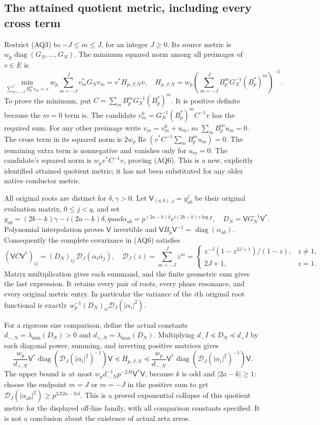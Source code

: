 \documentclass[11pt,a4paper]{article}
\theoremstyle{definition}\newtheorem{definition}[theorem]{Definition}
\begin{document}
\subsection{The attained quotient metric, including every cross term}
Restrict (AQ3) to $-J\le m\le J$, for an integer $J\ge0$. Its
source metric is $w_p\operatorname{diag}(G_N,\ldots,G_N)$.
The minimum squared norm among all preimages of $v\in E$ is
\[
 \min_{\sum_{m=-J}^J B_p^mv_m=v}
      w_p\sum_{m=-J}^Jv_m^*G_Nv_m
  =v^*H_{p,J;N}v,
 \quad
 H_{p,J;N}=w_p\left(
   \sum_{m=-J}^J B_p^mG_N^{-1}(B_p^*)^m\right)^{-1}.
 \tag{AQ6}
\]
To prove the minimum, put $C=\sum_mB_p^mG_N^{-1}(B_p^*)^m$.
It is positive definite because the $m=0$ term is. The candidate
$v_m^0=G_N^{-1}(B_p^*)^m C^{-1}v$ has the required sum. For any
other preimage write $v_m=v_m^0+u_m$, so $\sum_mB_p^mu_m=0$.
The cross term in its squared norm is
$2w_p\operatorname{Re}(v^*C^{-1}\sum_mB_p^mu_m)=0$.
The remaining extra term is nonnegative and vanishes only for $u_m=0$.
The candidate's squared norm is $w_pv^*C^{-1}v$, proving (AQ6).
This is a new, explicitly identified attained quotient metric; it has
not been substituted for any older native conductor metric.

All original roots are distinct for $\delta,\gamma>0$. Let
$\mathsf V_{(a,b),j}=y_{ab}^j$ be their original evaluation matrix,
$0\le j<q$, and set
\[
 y_{ab}=(2b-k)\gamma-i(2a-k)\delta,quad
 \alpha_{ab}=p^{(2a-k)\delta}e^{i(2b-k)\gamma\log p},\quad
 D_N=\mathsf V G_N^{-1}\mathsf V^*.
 \tag{AQ7}
\]
Polynomial interpolation proves $\mathsf V$ invertible and
$\mathsf V B_p\mathsf V^{-1}=\operatorname{diag}(\alpha_{ab})$.
Consequently the complete covariance in (AQ6) satisfies
\[
 (\mathsf V C\mathsf V^*)_{ij}
   =(D_N)_{ij}\,\mathcal D_J(\alpha_i\overline{\alpha_j}),
 \quad
 \mathcal D_J(z)=\sum_{m=-J}^J z^m
 =\begin{cases}
 z^{-J}(1-z^{2J+1})/(1-z),&z\ne1,\\
 2J+1,&z=1.
 \end{cases}
 \tag{AQ8}
\]
Matrix multiplication gives each summand, and the finite geometric sum
gives the last expression. It retains every pair of roots, every
phase resonance, and every original metric entry. In particular the
variance of the $i$th original root functional is exactly
$w_p^{-1}(D_N)_{ii}\mathcal D_J(|\alpha_i|^2)$.

For a rigorous size comparison, define the actual constants
$d_{-,N}=\lambda_{\min}(D_N)>0$ and
$d_{+,N}=\lambda_{\max}(D_N)$. Multiplying
$d_-I\preceq D_N\preceq d_+I$ by each diagonal power, summing, and
inverting positive matrices gives
\[
 \frac{w_p}{d_{+,N}}\mathsf V^*
   \operatorname{diag}(\mathcal D_J(|\alpha_i|^2)^{-1})\mathsf V
 \preceq H_{p,J;N}\preceq
 \frac{w_p}{d_{-,N}}\mathsf V^*
   \operatorname{diag}(\mathcal D_J(|\alpha_i|^2)^{-1})\mathsf V.
 \tag{AQ9}
\]
The upper bound is at most
$w_pd_{-,N}^{-1}p^{-2J\delta}\mathsf V^*\mathsf V$, because $k$
is odd and $|2a-k|\ge1$: choose the endpoint $m=J$ or $m=-J$ in
the positive sum to get
$\mathcal D_J(|\alpha_{ab}|^2)\ge p^{2J|2a-k|\delta}$.
This is a proved exponential collapse of this quotient metric for the
displayed off-line family, with all comparison constants specified.
It is not a conclusion about the existence of actual zeta zeros.
\end{document}
